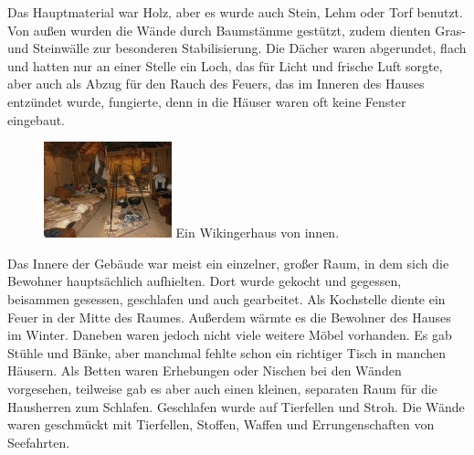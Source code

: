 \documentclass[12pt,a4paper,ngerman,openany]{book}
\begin{document}
Das Hauptmaterial war Holz, aber es wurde auch Stein, Lehm oder Torf benutzt. Von außen wurden die Wände durch Baumstämme gestützt, zudem dienten Gras- und Steinwälle zur besonderen Stabilisierung. Die Dächer waren abgerundet, flach und hatten nur an einer Stelle ein Loch, das für Licht und frische Luft sorgte, aber auch als Abzug für den Rauch des Feuers, das im Inneren des Hauses entzündet wurde, fungierte, denn in die Häuser waren oft keine Fenster eingebaut.


\begin{figure}
  \centering
  \includegraphics[width=0.33\textwidth]{innen.jpeg}
  Ein Wikingerhaus von innen.
\end{figure}

Das Innere der Gebäude war meist ein einzelner, großer Raum, in dem sich die Bewohner hauptsächlich aufhielten. Dort wurde gekocht und gegessen, beisammen gesessen, geschlafen und auch gearbeitet. Als Kochstelle diente ein Feuer in der Mitte des Raumes. Außerdem wärmte es die Bewohner des Hauses im Winter. Daneben waren jedoch nicht viele weitere Möbel vorhanden. Es gab Stühle und Bänke, aber manchmal fehlte schon ein richtiger Tisch in manchen Häusern. Als Betten waren Erhebungen oder Nischen bei den Wänden vorgesehen, teilweise gab es aber auch einen kleinen, separaten Raum für die Hausherren zum Schlafen. Geschlafen wurde auf Tierfellen und Stroh. Die Wände waren geschmückt mit Tierfellen, Stoffen, Waffen und Errungenschaften von Seefahrten.
\end{document}
